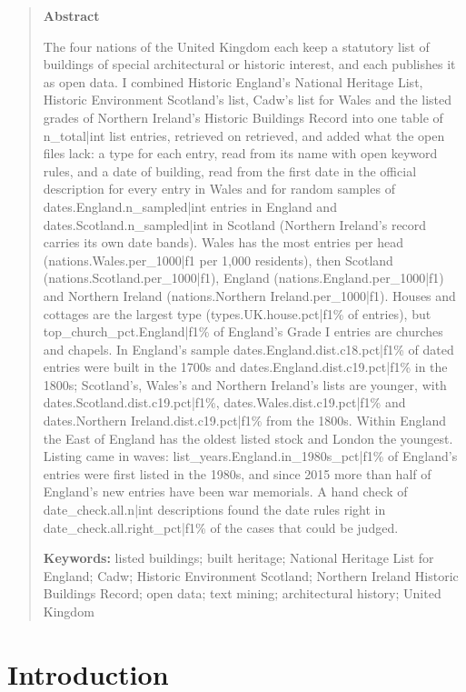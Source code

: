 \documentclass[11pt,a4paper]{article}
\begin{document}
\begin{quote}
\small
\begin{center}\textbf{Abstract}\end{center}
The four nations of the United Kingdom each keep a statutory list of buildings of special architectural or historic interest, and each publishes it as open data. I combined Historic England's National Heritage List, Historic Environment Scotland's list, Cadw's list for Wales and the listed grades of Northern Ireland's Historic Buildings Record into one table of {{n_total|int}} list entries, retrieved on {{retrieved}}, and added what the open files lack: a type for each entry, read from its name with open keyword rules, and a date of building, read from the first date in the official description for every entry in Wales and for random samples of {{dates.England.n_sampled|int}} entries in England and {{dates.Scotland.n_sampled|int}} in Scotland (Northern Ireland's record carries its own date bands). Wales has the most entries per head ({{nations.Wales.per_1000|f1}} per 1,000 residents), then Scotland ({{nations.Scotland.per_1000|f1}}), England ({{nations.England.per_1000|f1}}) and Northern Ireland ({{nations.Northern Ireland.per_1000|f1}}). Houses and cottages are the largest type ({{types.UK.house.pct|f1}}\% of entries), but {{top_church_pct.England|f1}}\% of England's Grade I entries are churches and chapels. In England's sample {{dates.England.dist.c18.pct|f1}}\% of dated entries were built in the 1700s and {{dates.England.dist.c19.pct|f1}}\% in the 1800s; Scotland's, Wales's and Northern Ireland's lists are younger, with {{dates.Scotland.dist.c19.pct|f1}}\%, {{dates.Wales.dist.c19.pct|f1}}\% and {{dates.Northern Ireland.dist.c19.pct|f1}}\% from the 1800s. Within England the East of England has the oldest listed stock and London the youngest. Listing came in waves: {{list_years.England.in_1980s_pct|f1}}\% of England's entries were first listed in the 1980s, and since 2015 more than half of England's new entries have been war memorials. A hand check of {{date_check.all.n|int}} descriptions found the date rules right in {{date_check.all.right_pct|f1}}\% of the cases that could be judged.

\textbf{Keywords:} listed buildings; built heritage; National Heritage List for England; Cadw; Historic Environment Scotland; Northern Ireland Historic Buildings Record; open data; text mining; architectural history; United Kingdom
\end{quote}

\section{Introduction}
\end{document}
